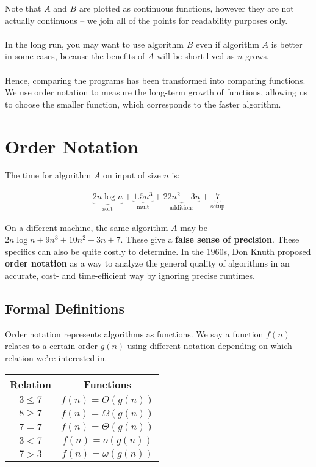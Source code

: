 \documentclass[]{article}
\theoremstyle{definition}
\newcommand{\lecture}[1]{\marginpar{{\footnotesize $\leftarrow$ \underline{#1}}}}
\begin{document}
			Note that $A$ and $B$ are plotted as continuous functions, however they are not actually continuous -- we join all of the points for readability purposes only.
			\\ \\
			In the long run, you may want to use algorithm $B$ even if algorithm $A$ is better in some cases, because the benefits of $A$ will be short lived as $n$ grows.
			\\ \\
			Hence, comparing the programs has been transformed into comparing functions. We use order notation to measure the long-term growth of functions, allowing us to choose the smaller function, which corresponds to the faster algorithm.
	
	\section{Order Notation} \lecture{January 10, 2013}
		The time for algorithm $A$ on input of size $n$ is:
		
		\begin{align*}
			\underbrace{2n \log n}_\text{sort} + \underbrace{1.5n^3}_\text{mult} + \underbrace{22n^2 - 3n}_\text{additions} + \underbrace{7}_\text{setup}
		\end{align*}
		
		On a different machine, the same algorithm $A$ may be $2n \log n + 9n^3 + 10n^2 - 3n + 7$. These give a \textbf{false sense of precision}. These specifics can also be quite costly to determine. In the 1960s, Don Knuth proposed \textbf{order notation} as a way to analyze the general quality of algorithms in an accurate, cost- and time-efficient way by ignoring precise runtimes.
		
		\subsection{Formal Definitions}
			Order notation represents algorithms as functions. We say a function $f(n)$ relates to a certain order $g(n)$ using different notation depending on which relation we're interested in.
			\begin{center}
				\begin{tabular}{|c|c|}
					\hline
					 Relation & Functions \\ \hline
					 $3 \le 7$ & $f(n) = O(g(n))$ \\
					 $8 \ge 7$ & $f(n) = \Omega(g(n))$ \\
					 $7 = 7$ & $f(n) = \Theta(g(n))$ \\
					 $3 < 7$ & $f(n) = o(g(n))$ \\
					 $7 > 3$ & $f(n) = \omega(g(n))$ \\ \hline
				\end{tabular}
			\end{center}
			
\end{document}
